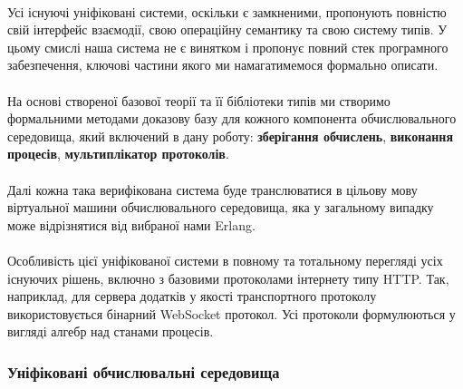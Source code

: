 \documentclass[11pt,oneside]{article}
\begin{document}
   \paragraph{}
   Усі існуючі уніфіковані системи, оскільки є замкненими, пропонують
   повністю свій інтерфейс взаємодії, свою операційну семантику та свою систему типів.
   У цьому смислі наша система не є винятком і пропонує повний стек
   програмного забезпечення, ключові частини якого ми намагатимемося формально
   описати.

   \paragraph{}
   На основі створеної базової теорії та її бібліотеки типів ми створимо
   формальними методами доказову базу для кожного компонента обчислювального
   середовища, який включений в дану роботу: {\bf зберігання обчислень},
   {\bf виконання процесів}, {\bf мультиплікатор протоколів}.

   \paragraph{}
   Далі кожна така верифікована система буде транслюватися в цільову мову
   віртуальної машини обчислювального середовища, яка у загальному випадку
   може відрізнятися від вибраної нами Erlang.

   \paragraph{}
   Особливість цієї уніфікованої системи в повному та тотальному перегляді
   усіх існуючих рішень, включно з базовими протоколами інтернету типу HTTP.
   Так, наприклад, для сервера додатків у якості транспортного протоколу
   використовується бінарний WebSocket протокол. Усі протоколи формулюються
   у вигляді алгебр над станами процесів.

\subsubsection{Уніфіковані обчислювальні середовища}
\end{document}
